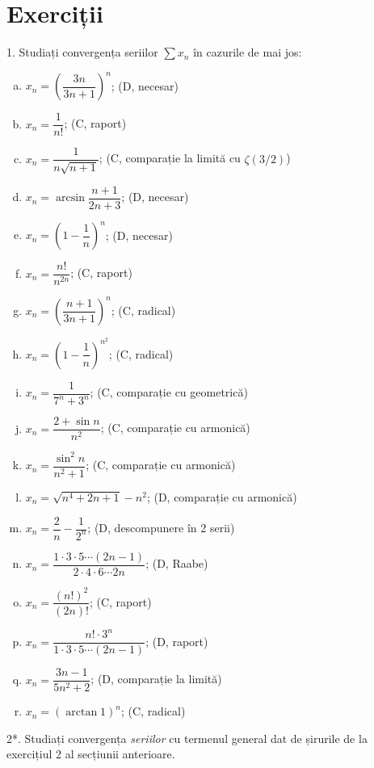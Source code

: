 \section{Exerciții}

1. Studiați convergența seriilor $ \sum x_n $ în cazurile de mai jos:
\begin{enumerate}[(a)]
    \item $ x_n = \left( \dfrac{3n}{3n + 1} \right)^n $; \hfill(D, necesar)
    \item $ x_n = \dfrac{1}{n!} $; \hfill(C, raport)
    \item $ x_n = \dfrac{1}{n\sqrt{n + 1}} $; \hfill(C, comparație la limită cu $\zeta(3/2)$)
    \item $ x_n = \arcsin \dfrac{n+1}{2n + 3} $; \hfill(D, necesar)
    \item $ x_n = \left( 1 - \dfrac{1}{n} \right)^n $; \hfill(D, necesar)
    \item $ x_n = \dfrac{n!}{n^{2n}} $; \hfill(C, raport)
    \item $ x_n = \left( \dfrac{n + 1}{3n + 1}\right)^n $; \hfill(C, radical)
    \item $ x_n = \left( 1 - \dfrac{1}{n} \right)^{n^2} $; \hfill(C, radical)
    \item $ x_n = \dfrac{1}{7^n + 3^n} $; \hfill(C, comparație cu geometrică)
    \item $ x_n = \dfrac{2 + \sin n}{n^2} $; \hfill(C, comparație cu armonică)
    \item $ x_n = \dfrac{\sin^2 n}{n^2 + 1} $; \hfill(C, comparație cu armonică)
    \item $ x_n = \sqrt{n^4 + 2n + 1} - n^2 $; \hfill(D, comparație cu armonică)
    \item $ x_n = \dfrac{2}{n} - \dfrac{1}{2^n} $; \hfill(D, descompunere în 2 serii)
    \item $ x_n = \dfrac{1 \cdot 3 \cdot 5 \cdots (2n - 1)}{2 \cdot 4 \cdot 6 \cdots 2n} $; \hfill(D, Raabe)
    \item $ x_n = \dfrac{(n!)^2}{(2n)!} $; \hfill(C, raport)
    \item $ x_n = \dfrac{n! \cdot 3^n}{1 \cdot 3 \cdot 5 \cdots (2n - 1) } $; \hfill(D, raport)
    \item $ x_n = \dfrac{3n - 1}{5n^2 + 2} $; \hfill(D, comparație la limită)
    \item $ x_n = (\arctan 1)^n $; \hfill(C, radical)
\end{enumerate}

\vspace{1cm}

2*. Studiați convergența \emph{seriilor} cu termenul general dat de șirurile de
la exercițiul 2 al secțiunii anterioare.






